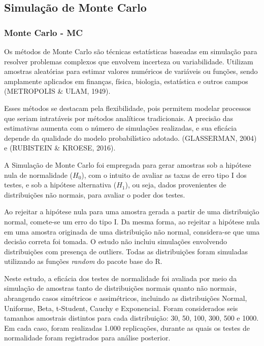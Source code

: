\documentclass[a4paper,11pt]{article} %
\begin{document}
\subsection{Simulação de Monte Carlo} %

\subsubsection{Monte Carlo - MC}

Os métodos de Monte Carlo são técnicas estatísticas baseadas em simulação para resolver problemas complexos que envolvem incerteza ou variabilidade. Utilizam amostras aleatórias para estimar valores numéricos de variáveis ou funções, sendo amplamente aplicados em finanças, física, biologia, estatística e outros campos (METROPOLIS \& ULAM, 1949). 

\vspace{0.5cm}

Esses métodos se destacam pela flexibilidade, pois permitem modelar processos que seriam intratáveis por métodos analíticos tradicionais. A precisão das estimativas aumenta com o número de simulações realizadas, e sua eficácia depende da qualidade do modelo probabilístico adotado. (GLASSERMAN, 2004) e (RUBISTEIN \& KROESE, 2016).

\vspace{0.5cm}

A Simulação de Monte Carlo foi empregada para gerar amostras sob a hipótese nula de normalidade ($H_0$), com o intuito de avaliar as taxas de erro tipo I dos testes, e sob a hipótese alternativa ($H_1$), ou seja, dados provenientes de distribuições não normais, para avaliar o poder dos testes.

\vspace{0.5cm}

Ao rejeitar a hipótese nula para uma amostra gerada a partir de uma distribuição normal, comete-se um erro do tipo I. Da mesma forma, ao rejeitar a hipótese nula em uma amostra originada de uma distribuição não normal, considera-se que uma decisão correta foi tomada. O estudo não incluiu simulações envolvendo distribuições com presença de outliers. Todas as distribuições foram simuladas utilizando as funções \textit{random} do pacote base do R.

\vspace{0.5cm}

Neste estudo, a eficácia dos testes de normalidade foi avaliada por meio da simulação de amostras tanto de distribuições normais quanto não normais, abrangendo casos simétricos e assimétricos, incluindo as distribuições Normal, Uniforme, Beta, t-Student, Cauchy e Exponencial. Foram considerados seis tamanhos amostrais distintos para cada distribuição: 30, 50, 100, 300, 500 e 1000. Em cada caso, foram realizadas 1.000 replicações, durante as quais os testes de normalidade foram registrados para análise posterior.
\end{document}

